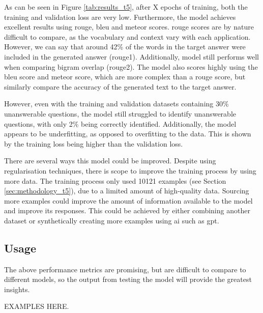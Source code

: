 As can be seen in Figure \ref{tab:results_t5}, after X epochs of training, both the training and validation loss are very low. Furthermore, the model achieves excellent results using \acrshort{rouge}, \acrshort{bleu} and \acrshort{meteor} scores. \acrshort{rouge} scores are by nature difficult to compare, as the vocabulary and context vary with each application. However, we can say that around 42\% of the words in the target answer were included in the generated answer (\acrshort{rouge}1). Additionally, model still performs well when comparing bigram overlap (\acrshort{rouge}2). The model also scores highly using the \acrshort{bleu} score and \acrshort{meteor} score, which are more complex than a \acrshort{rouge} score, but similarly compare the accuracy of the generated text to the target answer.

However, even with the training and validation datasets containing 30\% unanswerable questions, the model still struggled to identify unanswerable questions, with only 2\% being correctly identified. Additionally, the model appears to be underfitting, as opposed to overfitting to the data. This is shown by the training loss being higher than the validation loss.

There are several ways this model could be improved. Despite using regularisation techniques, there is scope to improve the training process by using more data. The training process only used 10121 examples (see Section \ref{sec:methodology_t5}), due to a limited amount of high-quality data. Sourcing more examples could improve the amount of information available to the model and improve its responses. This could be achieved by either combining another dataset or synthetically creating more examples using \acrlong{ai} such as \acrshort{gpt}.

\subsection{Usage}
The above performance metrics are promising, but are difficult to compare to different models, so the output from testing the model will provide the greatest insights.

EXAMPLES HERE.

